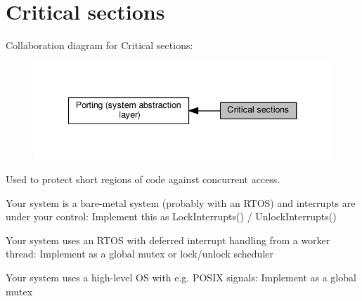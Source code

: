 \hypertarget{group__sys__prot}{}\section{Critical sections}
\label{group__sys__prot}
Collaboration diagram for Critical sections\+:
\nopagebreak
\begin{figure}[H]
\begin{center}
\leavevmode
\includegraphics[width=340pt]{group__sys__prot}
\end{center}
\end{figure}
Used to protect short regions of code against concurrent access.
\begin{DoxyItemize}
\item Your system is a bare-\/metal system (probably with an R\+T\+OS) and interrupts are under your control\+: Implement this as Lock\+Interrupts() / Unlock\+Interrupts()
\item Your system uses an R\+T\+OS with deferred interrupt handling from a worker thread\+: Implement as a global mutex or lock/unlock scheduler
\item Your system uses a high-\/level OS with e.\+g. P\+O\+S\+IX signals\+: Implement as a global mutex 
\end{DoxyItemize}